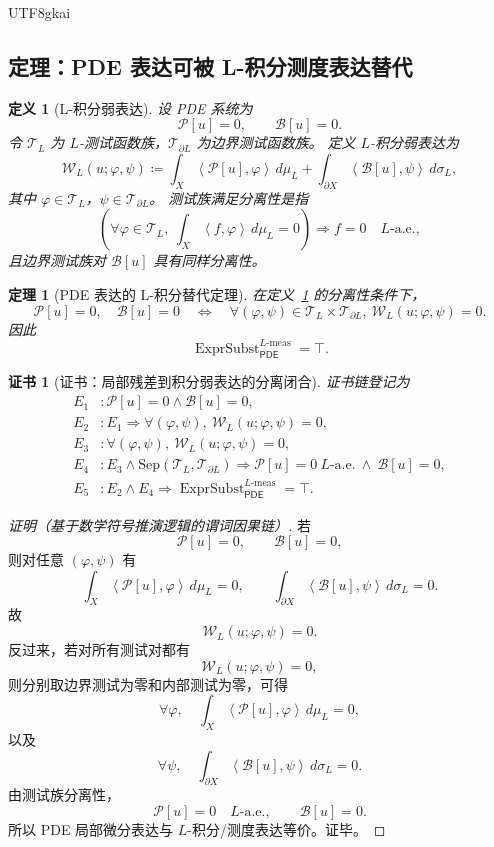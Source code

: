 \documentclass[12pt]{article}
\newtheorem{definition}{定义}[section]
\newtheorem{theorem}{定理}[section]
\newtheorem{Certificate}{证书}[section]
\newcommand{\DefEq}{\coloneqq}
\newcommand{\Pcal}{\mathcal P}
\newcommand{\Bcal}{\mathcal B}
\newcommand{\PDE}{\ensuremath{\mathsf{PDE}}}
\newcommand{\ip}[2]{\left\langle #1,#2 \right\rangle}
\DeclareMathOperator{\ExprSubst}{ExprSubst}
\newcommand{\Lmeas}{L\text{-}\mathrm{meas}}
\begin{document}
\begin{CJK*}{UTF8}{gkai}
\subsection{定理：PDE 表达可被 L-积分测度表达替代}
\label{subsec:tex58-expression-substitution-theorem}

\begin{definition}[L-积分弱表达]
\label{def:tex58-l-weak-expression}
设 PDE 系统为
\[
  \Pcal[u]=0,
  \qquad
  \Bcal[u]=0.
\]
令 \(\mathcal T_L\) 为 \(L\)-测试函数族，\(\mathcal T_{\partial L}\) 为边界测试函数族。
定义 \(L\)-积分弱表达为
\[
  \mathcal W_L(u;\varphi,\psi)
  \DefEq
  \int_X
  \ip{\Pcal[u]}{\varphi}\,d\mu_L
  +
  \int_{\partial X}
  \ip{\Bcal[u]}{\psi}\,d\sigma_L,
\]
其中 \(\varphi\in\mathcal T_L\)，\(\psi\in\mathcal T_{\partial L}\)。
测试族满足分离性是指
\[
  \left(
  \forall \varphi\in\mathcal T_L,\ 
  \int_X\ip{f}{\varphi}\,d\mu_L=0
  \right)
  \Rightarrow
  f=0\quad L\text{-a.e.},
\]
且边界测试族对 \(\Bcal[u]\) 具有同样分离性。
\end{definition}

\begin{theorem}[PDE 表达的 L-积分替代定理]
\label{thm:tex58-expression-substitution}
在定义~\ref{def:tex58-l-weak-expression} 的分离性条件下，
\[
  \Pcal[u]=0,\quad \Bcal[u]=0
  \quad\Longleftrightarrow\quad
  \forall(\varphi,\psi)\in\mathcal T_L\times\mathcal T_{\partial L},\
  \mathcal W_L(u;\varphi,\psi)=0.
\]
因此
\[
  \ExprSubst_{\PDE}^{\Lmeas}=\top.
\]
\end{theorem}

\begin{Certificate}[证书：局部残差到积分弱表达的分离闭合]
\label{cert:tex58-expression-substitution}
证书链登记为
\[
\begin{aligned}
  E_1 &: \Pcal[u]=0\wedge \Bcal[u]=0,\\
  E_2 &: E_1\Rightarrow
  \forall(\varphi,\psi),\
  \mathcal W_L(u;\varphi,\psi)=0,\\
  E_3 &: \forall(\varphi,\psi),\
  \mathcal W_L(u;\varphi,\psi)=0,\\
  E_4 &: E_3\wedge \mathrm{Sep}(\mathcal T_L,\mathcal T_{\partial L})
  \Rightarrow
  \Pcal[u]=0\ L\text{-a.e.}\ \wedge\ \Bcal[u]=0,\\
  E_5 &: E_2\wedge E_4
  \Rightarrow
  \ExprSubst_{\PDE}^{\Lmeas}=\top.
\end{aligned}
\]
\end{Certificate}

\begin{proof}[证明（基于数学符号推演逻辑的谓词因果链）]
若
\[
  \Pcal[u]=0,
  \qquad
  \Bcal[u]=0,
\]
则对任意 \((\varphi,\psi)\) 有
\[
  \int_X\ip{\Pcal[u]}{\varphi}\,d\mu_L=0,
  \qquad
  \int_{\partial X}\ip{\Bcal[u]}{\psi}\,d\sigma_L=0.
\]
故
\[
  \mathcal W_L(u;\varphi,\psi)=0.
\]
反过来，若对所有测试对都有
\[
  \mathcal W_L(u;\varphi,\psi)=0,
\]
则分别取边界测试为零和内部测试为零，可得
\[
  \forall\varphi,\quad
  \int_X\ip{\Pcal[u]}{\varphi}\,d\mu_L=0,
\]
以及
\[
  \forall\psi,\quad
  \int_{\partial X}\ip{\Bcal[u]}{\psi}\,d\sigma_L=0.
\]
由测试族分离性，
\[
  \Pcal[u]=0\quad L\text{-a.e.},
  \qquad
  \Bcal[u]=0.
\]
所以 PDE 局部微分表达与 \(L\)-积分/测度表达等价。证毕。
\end{proof}


\end{CJK*}
\end{document}
